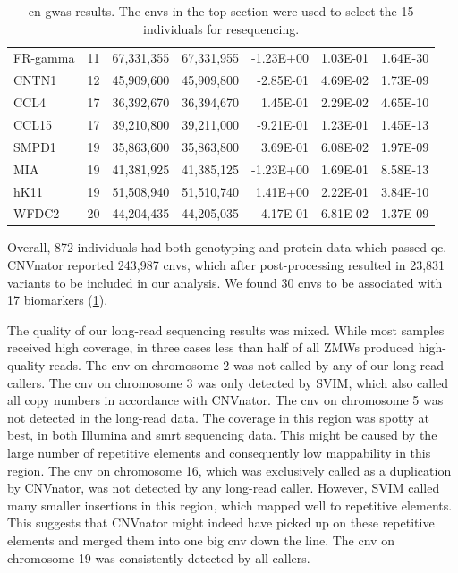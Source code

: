 \documentclass[twoside=false]{scrbook}
\begin{document}
\begin{table}[]
\begin{tabular}{@{}lrrrrrr@{}}
        FR-gamma & 11 & 67,331,355  & 67,331,955  & -1.23E+00 & 1.03E-01 & 1.64E-30 \\
        CNTN1    & 12 & 45,909,600  & 45,909,800  & -2.85E-01 & 4.69E-02 & 1.73E-09 \\
        CCL4     & 17 & 36,392,670  & 36,394,670  & 1.45E-01  & 2.29E-02 & 4.65E-10 \\
        CCL15    & 17 & 39,210,800  & 39,211,000  & -9.21E-01 & 1.23E-01 & 1.45E-13 \\
        SMPD1    & 19 & 35,863,600  & 35,863,800  & 3.69E-01  & 6.08E-02 & 1.97E-09 \\
        MIA      & 19 & 41,381,925  & 41,385,125  & -1.23E+00 & 1.69E-01 & 8.58E-13 \\
        hK11     & 19 & 51,508,940  & 51,510,740  & 1.41E+00  & 2.22E-01 & 3.84E-10 \\
        WFDC2    & 20 & 44,204,435  & 44,205,035  & 4.17E-01  & 6.81E-02 & 1.37E-09 \\
        \bottomrule
    \end{tabular}
    \caption{\Gls{cn}-\gls{gwas} results.
        The \glspl{cnv} in the top section were used to select the 15 individuals for resequencing.}
    \label{tab:cngwas}
\end{table}

Overall, 872 individuals had both genotyping and protein data which passed \gls{qc}.
\textsf{CNVnator} reported 243,987 \glspl{cnv}, which after post-processing resulted in 23,831 variants to be included in our analysis.
We found 30 \glspl{cnv} to be associated with 17 biomarkers (\cref{tab:cngwas}).

The quality of our long-read sequencing results was mixed.
While most samples received high coverage, in three cases less than half of all ZMWs produced high-quality reads.
The \gls{cnv} on chromosome 2 was not called by any of our long-read callers.
The \gls{cnv} on chromosome 3 was only detected by \textsf{SVIM}, which also called all copy numbers in accordance with \textsf{CNVnator}.
The \gls{cnv} on chromosome 5 was not detected in the long-read data.
The coverage in this region was spotty at best, in both Illumina and \gls{smrt} sequencing data.
This might be caused by the large number of repetitive elements and consequently low mappability in this region.
The \gls{cnv} on chromosome 16, which was exclusively called as a duplication by \textsf{CNVnator}, was not detected by any long-read caller.
However, \textsf{SVIM} called many smaller insertions in this region, which mapped well to repetitive elements.
This suggests that \textsf{CNVnator} might indeed have picked up on these repetitive elements and merged them into one big \gls{cnv} down the line.
The \gls{cnv} on chromosome 19 was consistently detected by all callers.
\end{document}
